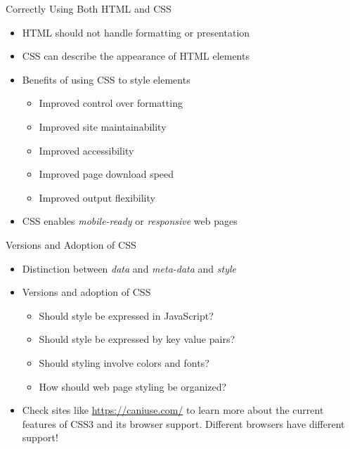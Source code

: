 \documentclass[14pt,aspectratio=169]{beamer}
\begin{document}
%
\begin{frame}{Correctly Using Both HTML and CSS}
%
  \begin{itemize}
    \item HTML should not handle formatting or presentation
      \vspace*{-.2in}
    \item CSS can describe the appearance of HTML elements
      \vspace*{-.15in}
    \item Benefits of using CSS to style elements
      \begin{itemize}
        \item Improved control over formatting
        \item Improved site maintainability
        \item Improved accessibility
        \item Improved page download speed
        \item Improved output flexibility
      \end{itemize}
      \vspace*{-.2in}
    \item CSS enables {\em mobile-ready} or {\em responsive} web pages
  \end{itemize}
%
\end{frame}

%
\begin{frame}{Versions and Adoption of CSS}
%
  \begin{itemize}
    \item Distinction between {\em data} and {\em meta-data} and {\em style}
      \vspace*{-.1in}
    \item Versions and adoption of CSS
      \begin{itemize}
        \item Should style be expressed in JavaScript?
        \item Should style be expressed by key value pairs?
        \item Should styling involve colors and fonts?
        \item How should web page styling be organized?
      \end{itemize}
      \vspace*{-.2in}
    \item Check sites like \url{https://caniuse.com/} to learn more about the
      current features of CSS3 and its browser support. Different browsers have
      different support!
  \end{itemize}
%
\end{frame}
\end{document}
